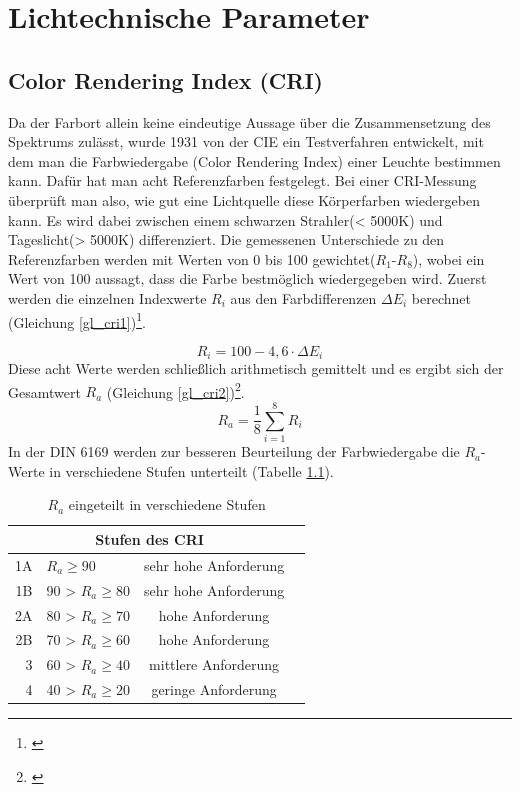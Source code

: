 \chapter{Lichtechnische Parameter}

\section{Color Rendering Index (CRI)} \label{sec_cri}

Da der Farbort allein keine eindeutige Aussage über die Zusammensetzung des Spektrums zulässt, wurde 1931 von der CIE ein Testverfahren entwickelt, mit dem man die Farbwiedergabe (Color Rendering Index) einer Leuchte bestimmen kann. Dafür hat man acht Referenzfarben festgelegt. Bei einer CRI-Messung überprüft man also, wie gut eine Lichtquelle diese Körperfarben wiedergeben kann. Es wird dabei zwischen einem schwarzen Strahler(< 5000K) und Tageslicht(> 5000K) differenziert. Die gemessenen Unterschiede zu den Referenzfarben werden mit Werten von 0 bis 100 gewichtet($R_{1}$-$R_{8}$), wobei ein Wert von 100 aussagt, dass die Farbe bestmöglich wiedergegeben wird. Zuerst werden die einzelnen Indexwerte $R_{i}$ aus den Farbdifferenzen $\Delta E_{i}$ berechnet (Gleichung \ref{gl_cri1})\footnote{\cite{davis_ohno}}.

	\begin{equation}\label{gl_cri1}
		R_{i} = 100 - 4,6 \cdot \Delta E_{i}
	\end{equation}
Diese acht Werte werden schließlich arithmetisch gemittelt und es ergibt sich der Gesamtwert $R_{a}$ (Gleichung \ref{gl_cri2})\footnote{\cite{production partner}}.
	\begin{equation}\label{gl_cri2}
		R_{a} =\frac{1}{8} \sum_{i=1}^{8} R_{i}
	\end{equation}
In der DIN 6169 werden zur besseren Beurteilung der Farbwiedergabe die $R_{a}$-Werte in verschiedene Stufen unterteilt (Tabelle \ref{t_cri}).

	\begin{table}[htp] 
		\centering
		\begin{tabular}{rlcc}  %
		\toprule
		\multicolumn{3}{c}{\large\sffamily Stufen des CRI}\\ 							
		\midrule
		1A & $R_{a} \geq 90$ & sehr hohe Anforderung\\ 
		1B & 90 > $R_{a} \geq 80$ & sehr hohe Anforderung\\
		2A & 80 > $R_{a} \geq 70$ & hohe Anforderung\\
		2B & 70 > $R_{a} \geq 60$ & hohe Anforderung\\
		3 & 60 > $R_{a} \geq 40$ & mittlere Anforderung\\
		4 & 40 > $R_{a} \geq 20$ & geringe Anforderung\\
		\bottomrule
		\end{tabular}
		\caption{$R_{a}$ eingeteilt in verschiedene Stufen\protect\footnotemark}	
		\label{t_cri}
	\end{table}

